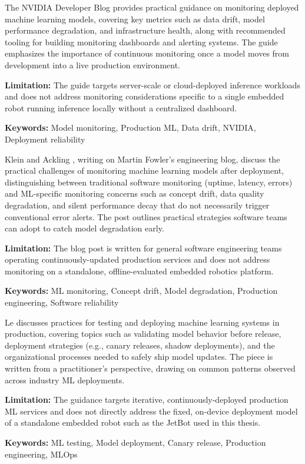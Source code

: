{
	The NVIDIA Developer Blog \cite{NVIDIA:2023} provides practical guidance on monitoring deployed machine learning models, covering key metrics such as data drift, model performance degradation, and infrastructure health, along with recommended tooling for building monitoring dashboards and alerting systems. The guide emphasizes the importance of continuous monitoring once a model moves from development into a live production environment.
	
	\bigskip
	\textbf{Limitation:} The guide targets server-scale or cloud-deployed inference workloads and does not address monitoring considerations specific to a single embedded robot running inference locally without a centralized dashboard.
	
	\scriptsize{\textbf{Keywords:} Model monitoring, Production ML, Data drift, NVIDIA, Deployment reliability}
}

{
	Klein and Ackling \cite{Klein:2020}, writing on Martin Fowler's engineering blog, discuss the practical challenges of monitoring machine learning models after deployment, distinguishing between traditional software monitoring (uptime, latency, errors) and ML-specific monitoring concerns such as concept drift, data quality degradation, and silent performance decay that do not necessarily trigger conventional error alerts. The post outlines practical strategies software teams can adopt to catch model degradation early.
	
	\bigskip
	\textbf{Limitation:} The blog post is written for general software engineering teams operating continuously-updated production services and does not address monitoring on a standalone, offline-evaluated embedded robotics platform.
	
	\scriptsize{\textbf{Keywords:} ML monitoring, Concept drift, Model degradation, Production engineering, Software reliability}
}

{
	Le \cite{Kle:2020} discusses practices for testing and deploying machine learning systems in production, covering topics such as validating model behavior before release, deployment strategies (e.g., canary releases, shadow deployments), and the organizational processes needed to safely ship model updates. The piece is written from a practitioner's perspective, drawing on common patterns observed across industry ML deployments.
	
	\bigskip
	\textbf{Limitation:} The guidance targets iterative, continuously-deployed production ML services and does not directly address the fixed, on-device deployment model of a standalone embedded robot such as the JetBot used in this thesis.
	
	\scriptsize{\textbf{Keywords:} ML testing, Model deployment, Canary release, Production engineering, MLOps}
}


